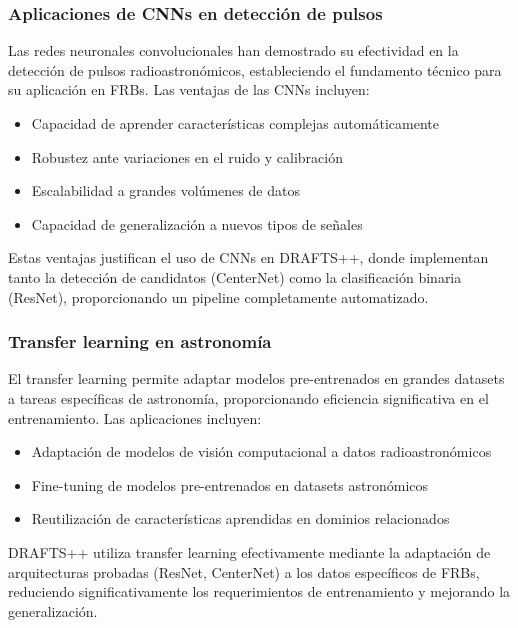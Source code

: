 \subsubsection{Aplicaciones de CNNs en detección de pulsos}

Las redes neuronales convolucionales han demostrado su efectividad en la detección de pulsos radioastronómicos, estableciendo el fundamento técnico para su aplicación en FRBs. Las ventajas de las CNNs incluyen:

\begin{itemize}
    \item Capacidad de aprender características complejas automáticamente
    \item Robustez ante variaciones en el ruido y calibración
    \item Escalabilidad a grandes volúmenes de datos
    \item Capacidad de generalización a nuevos tipos de señales
\end{itemize}

Estas ventajas justifican el uso de CNNs en DRAFTS++, donde implementan tanto la detección de candidatos (CenterNet) como la clasificación binaria (ResNet), proporcionando un pipeline completamente automatizado.

\subsubsection{Transfer learning en astronomía}

El transfer learning permite adaptar modelos pre-entrenados en grandes datasets a tareas específicas de astronomía, proporcionando eficiencia significativa en el entrenamiento. Las aplicaciones incluyen:

\begin{itemize}
    \item Adaptación de modelos de visión computacional a datos radioastronómicos
    \item Fine-tuning de modelos pre-entrenados en datasets astronómicos
    \item Reutilización de características aprendidas en dominios relacionados
\end{itemize}

DRAFTS++ utiliza transfer learning efectivamente mediante la adaptación de arquitecturas probadas (ResNet, CenterNet) a los datos específicos de FRBs, reduciendo significativamente los requerimientos de entrenamiento y mejorando la generalización.

